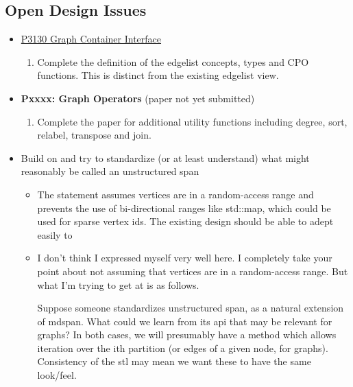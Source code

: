 \subsection{Open Design Issues}
\begin{itemize}
      \item \href{https://www.wg21.link/P3130}{P3130 Graph Container Interface}
            \begin{enumerate}
                  \item Complete the definition of the edgelist concepts, types and CPO functions. This is distinct from the existing edgelist view.
            \end{enumerate}
      \item \textbf{Pxxxx: Graph Operators} (paper not yet submitted)
            \begin{enumerate}
                  \item Complete the paper for additional utility functions including degree, sort, relabel, transpose and join.
            \end{enumerate}
      \item Build on  and try to standardize (or at least understand) what might reasonably be called an unstructured span
            \begin{itemize}
                  \item The statement assumes vertices are in a random-access range and prevents the use of bi-directional ranges like std::map, which 
                        could be used for sparse vertex ids. The existing design should be able to adept easily to 
                  \item I don't think I expressed myself very well here. I completely take your point about not assuming that vertices are in a random-access range. 
                        But what I'm trying to get at is as follows. 
                        
                        Suppose someone standardizes unstructured span, as a natural extension of mdspan. What could we 
                        learn from its api that may be relevant for graphs? In both cases, we will presumably have a method which allows iteration over the ith partition 
                        (or edges of a given node, for graphs). Consistency of the stl may mean we want these to have the same look/feel.
            \end{itemize}
\end{itemize}

